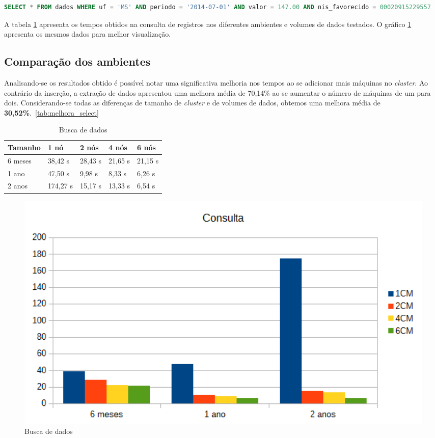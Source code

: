 \begin{lstlisting}[caption={Consulta CQL},label={lst:cql_select},language=SQL]
SELECT * FROM dados WHERE uf = 'MS' AND periodo = '2014-07-01' AND valor = 147.00 AND nis_favorecido = 00020915229557
\end{lstlisting}

A tabela \ref{tab:select_busca} apresenta os tempos obtidos na consulta de registros nos diferentes ambientes e volumes de dados testados. O gráfico \ref{fig:graph_select_busca} apresenta os mesmos dados para melhor visualização.

\subsection{Comparação dos ambientes}
Analisando-se os resultados obtido é possível notar uma significativa melhoria nos tempos ao se adicionar mais máquinas no \emph{cluster}. Ao contrário da inserção, a extração de dados apresentou uma melhora média de 70,14\% ao se aumentar o número de máquinas de um para dois. Considerando-se todas as diferenças de tamanho de \emph{cluster} e de volumes de dados, obtemos uma melhora média de \textbf{30,52\%}.~\ref{tab:melhora_select}

\begin{table}[]
	\centering
	\caption{Busca de dados}
	\label{tab:select_busca}
	\begin{tabular}{lllll}
		\textbf{Tamanho} & \textbf{1 nó} & \textbf{2 nós} & \textbf{4 nós} & \textbf{6 nós} \\ \hline
		6 meses          & 38,42 s		 & 28,43 s        & 21,65 s        & 21,15 s        \\ \hline
		1 ano            & 47,50 s 		 & 9,98 s         & 8,33 s         & 6,26 s         \\ \hline
		2 anos           & 174,27 s		 & 15,17 s        & 13,33 s        & 6,54 s         \\ \hline
	\end{tabular}
\end{table}

\begin{figure}[!htb]
	\centering
	\includegraphics[width=1\textwidth]{figuras/graph_select_buscas.png}
	\caption{Busca de dados}
	\label{fig:graph_select_busca}
\end{figure}


